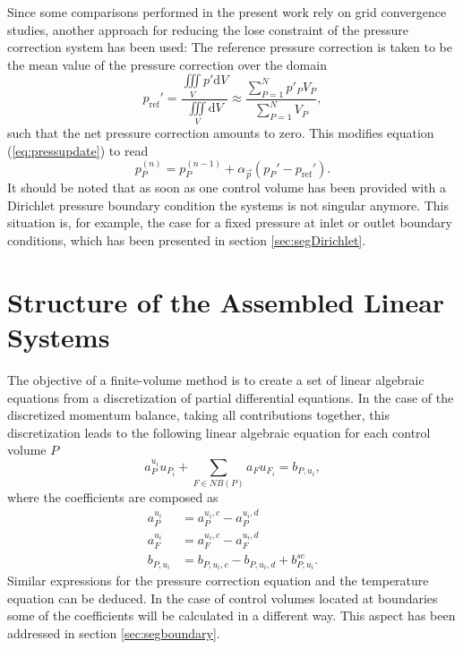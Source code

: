 Since some comparisons performed in the present work rely on grid convergence studies, another approach for reducing the lose constraint of the pressure correction system has been used: The reference pressure correction is taken to be the mean value of the pressure correction over the domain 
\begin{displaymath}
  p_{\text{ref}}' 
  = \frac{\iiint\limits_V p' \mathrm{d}V}{\iiint\limits_V \mathrm{d}V} 
    \approx \frac{\sum_{P = 1}^N p'_P V_P}{\sum_{P = 1}^N V_P},
\end{displaymath}
such that the net pressure correction amounts to zero. This modifies equation (\ref{eq:pressupdate}) to read
\begin{displaymath}
  p_P^{(n)} = p_P^{(n-1)} + \alpha_{\vec{p}} \left( p_P' - p_{\text{ref}}' \right).
\end{displaymath}
It should be noted that as soon as one control volume has been provided with a Dirichlet pressure boundary condition the systems is not singular anymore. This situation is, for example, the case for a fixed pressure at inlet or outlet boundary conditions, which has been presented in section \ref{sec:segDirichlet}.

\section{Structure of the Assembled Linear Systems}
\label{sec:structure}

The objective of a finite-volume method is to create a set of linear algebraic equations from a discretization of partial differential equations. In the case of the discretized momentum balance, taking all contributions together, this discretization leads to the following linear algebraic equation for each control volume \(P\)
\begin{displaymath}
  a_P^{u_i} u_{P_i} + \sum_{F \in NB(P)} a_F u_{F_i} = b_{P,u_i},
\end{displaymath}
where the coefficients are composed as
\begin{align*}
  a_P^{u_i} &= a_P^{u_i,c} - a_P^{u_i,d} \\
  a_F^{u_i} &= a_F^{u_i,c} - a_F^{u_i,d} \\
  b_{P,u_i} &= b_{P,u_i,c} - b_{P,u_i,d} + b_{P,u_i}^{sc}.
\end{align*}
Similar expressions for the pressure correction equation and the temperature equation can be deduced. In the case of control volumes located at boundaries some of the coefficients will be calculated in a different way. This aspect has been addressed in section \ref{sec:segboundary}.

